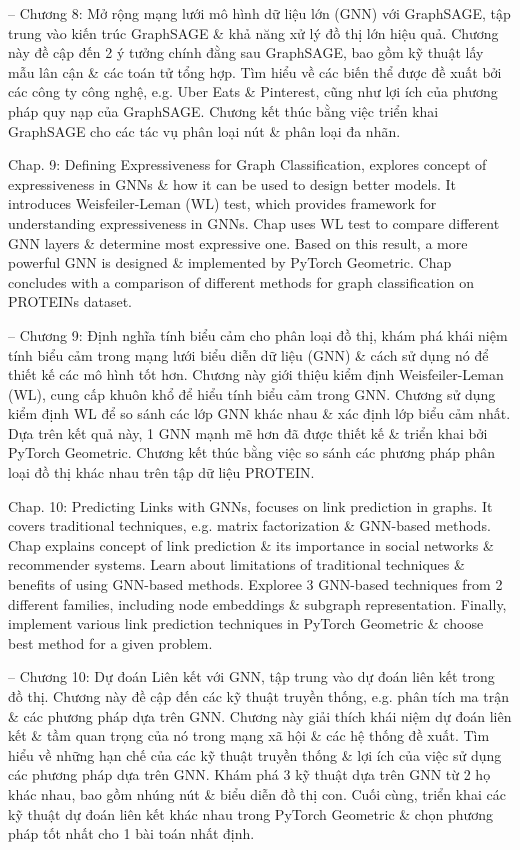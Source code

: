 \documentclass{article}
\begin{document}
\begin{itemize}
\begin{itemize}
        -- Chương 8: Mở rộng mạng lưới mô hình dữ liệu lớn (GNN) với GraphSAGE, tập trung vào kiến trúc GraphSAGE \& khả năng xử lý đồ thị lớn hiệu quả. Chương này đề cập đến 2 ý tưởng chính đằng sau GraphSAGE, bao gồm kỹ thuật lấy mẫu lân cận \& các toán tử tổng hợp. Tìm hiểu về các biến thể được đề xuất bởi các công ty công nghệ, e.g. Uber Eats \& Pinterest, cũng như lợi ích của phương pháp quy nạp của GraphSAGE. Chương kết thúc bằng việc triển khai GraphSAGE cho các tác vụ phân loại nút \& phân loại đa nhãn.

        Chap. 9: Defining Expressiveness for Graph Classification, explores concept of expressiveness in GNNs \& how it can be used to design better models. It introduces Weisfeiler-Leman (WL) test, which provides framework for understanding expressiveness in GNNs. Chap uses WL test to compare different GNN layers \& determine most expressive one. Based on this result, a more powerful GNN is designed \& implemented by PyTorch Geometric. Chap concludes with a comparison of different methods for graph classification on PROTEINs dataset.

        -- Chương 9: Định nghĩa tính biểu cảm cho phân loại đồ thị, khám phá khái niệm tính biểu cảm trong mạng lưới biểu diễn dữ liệu (GNN) \& cách sử dụng nó để thiết kế các mô hình tốt hơn. Chương này giới thiệu kiểm định Weisfeiler-Leman (WL), cung cấp khuôn khổ để hiểu tính biểu cảm trong GNN. Chương sử dụng kiểm định WL để so sánh các lớp GNN khác nhau \& xác định lớp biểu cảm nhất. Dựa trên kết quả này, 1 GNN mạnh mẽ hơn đã được thiết kế \& triển khai bởi PyTorch Geometric. Chương kết thúc bằng việc so sánh các phương pháp phân loại đồ thị khác nhau trên tập dữ liệu PROTEIN.

        Chap. 10: Predicting Links with GNNs, focuses on link prediction in graphs. It covers traditional techniques, e.g. matrix factorization \& GNN-based methods. Chap explains concept of link prediction \& its importance in social networks \& recommender systems. Learn about limitations of traditional techniques \& benefits of using GNN-based methods. Exploree 3 GNN-based techniques from 2 different families, including node embeddings \& subgraph representation. Finally, implement various link prediction techniques in PyTorch Geometric \& choose best method for a given problem.

        -- Chương 10: Dự đoán Liên kết với GNN, tập trung vào dự đoán liên kết trong đồ thị. Chương này đề cập đến các kỹ thuật truyền thống, e.g. phân tích ma trận \& các phương pháp dựa trên GNN. Chương này giải thích khái niệm dự đoán liên kết \& tầm quan trọng của nó trong mạng xã hội \& các hệ thống đề xuất. Tìm hiểu về những hạn chế của các kỹ thuật truyền thống \& lợi ích của việc sử dụng các phương pháp dựa trên GNN. Khám phá 3 kỹ thuật dựa trên GNN từ 2 họ khác nhau, bao gồm nhúng nút \& biểu diễn đồ thị con. Cuối cùng, triển khai các kỹ thuật dự đoán liên kết khác nhau trong PyTorch Geometric \& chọn phương pháp tốt nhất cho 1 bài toán nhất định.


\end{itemize}
\end{itemize}
\end{document}
